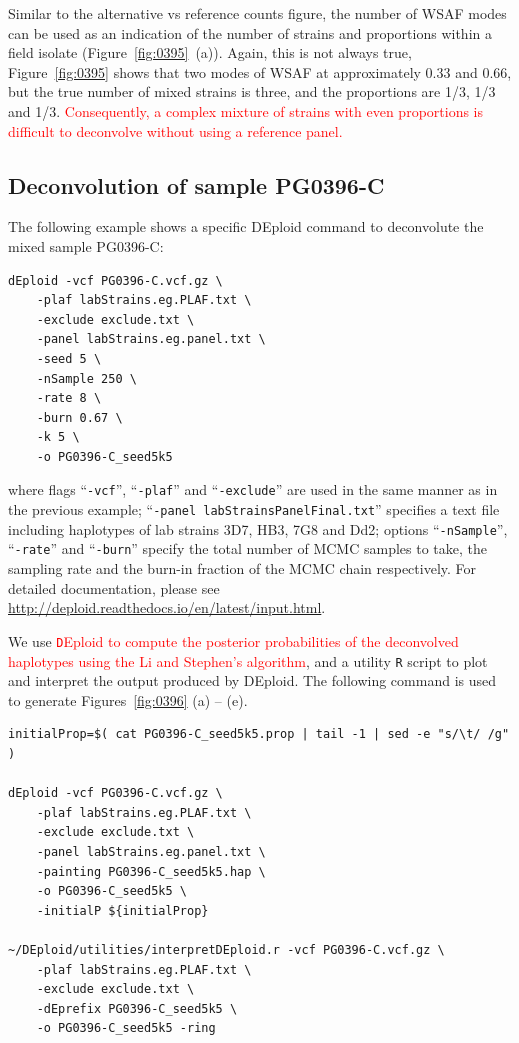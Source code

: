 \documentclass{article}
\begin{document}
Similar to the alternative vs reference counts figure, the number of WSAF modes can be used as an indication of the number of strains and proportions within a field isolate (Figure~\ref{fig:0395}~(a)). Again, this is not always true, Figure~\ref{fig:0395} shows that two modes of WSAF at approximately 0.33 and 0.66, but the true number of mixed strains is three, and the proportions are 1/3, 1/3 and 1/3. \textcolor{red}{Consequently, a complex mixture of strains with even proportions is difficult to deconvolve without using a reference panel.}


\subsection{Deconvolution of sample {\textmd PG0396-C}}
The following example shows a specific {\textmd DEploid} command to deconvolute the mixed sample {\textmd PG0396-C}:
\linespread{1}
\begin{lstlisting}
dEploid -vcf PG0396-C.vcf.gz \
    -plaf labStrains.eg.PLAF.txt \
    -exclude exclude.txt \
    -panel labStrains.eg.panel.txt \
    -seed 5 \
    -nSample 250 \
    -rate 8 \
    -burn 0.67 \
    -k 5 \
    -o PG0396-C_seed5k5
\end{lstlisting}
\linespread{1.5}
where flags ``{\tt -vcf}'', ``{\tt -plaf}'' and ``{\tt -exclude}'' are used in the same manner as in the previous example; ``{\tt -panel labStrainsPanelFinal.txt}'' specifies a text file including haplotypes of lab strains 3D7, HB3, 7G8 and Dd2; options ``{\tt -nSample}'', ``{\tt -rate}'' and ``{\tt -burn}'' specify the total number of MCMC samples to take, the sampling rate and the burn-in fraction of the MCMC chain respectively. For detailed documentation, please see \url{http://deploid.readthedocs.io/en/latest/input.html}.


We use \textcolor{red}{{\texttt DEploid} to compute the posterior probabilities of the deconvolved haplotypes using the Li and Stephen's algorithm}, and a utility {\tt R} script to plot and interpret the output produced by DEploid. The following command is used to generate Figures~\ref{fig:0396} (a) -- (e).
\linespread{1}
\begin{lstlisting}
initialProp=$( cat PG0396-C_seed5k5.prop | tail -1 | sed -e "s/\t/ /g" )

dEploid -vcf PG0396-C.vcf.gz \
    -plaf labStrains.eg.PLAF.txt \
    -exclude exclude.txt \
    -panel labStrains.eg.panel.txt \
    -painting PG0396-C_seed5k5.hap \
    -o PG0396-C_seed5k5 \
    -initialP ${initialProp}

~/DEploid/utilities/interpretDEploid.r -vcf PG0396-C.vcf.gz \
    -plaf labStrains.eg.PLAF.txt \
    -exclude exclude.txt \
    -dEprefix PG0396-C_seed5k5 \
    -o PG0396-C_seed5k5 -ring
\end{lstlisting}
\linespread{1.5}
\end{document}
